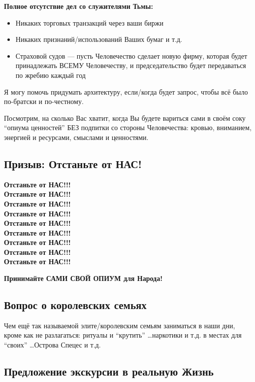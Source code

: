 \documentclass[11pt,a4paper]{article}
\theoremstyle{definition}
\theoremstyle{remark}
\begin{document}
{\textbf{Полное отсутствие дел со служителями Тьмы:}
\begin{itemize}
\item Никаких торговых транзакций через ваши биржи
\item Никаких признаний/использований Ваших бумаг и т.д.
\item Страховой судов — пусть Человечество сделает новую фирму, которая будет 
принадлежать ВСЕМУ Человечеству, и председательство будет передаваться по жребию 
каждый год
\end{itemize}

Я могу помочь придумать архитектуру, если/когда будет запрос, чтобы всё было 
по-братски и по-честному.

Посмотрим, на сколько Вас хватит, когда Вы будете вариться сами в своём соку 
``опиума ценностей'' БЕЗ подпитки со стороны Человечества: кровью, вниманием, 
энергией и ресурсами, смыслами и ценностями.

\subsection{Призыв: Отстаньте от НАС!}

\textbf{Отстаньте от НАС!!!}\\
\textbf{Отстаньте от НАС!!!}\\
\textbf{Отстаньте от НАС!!!}\\
\textbf{Отстаньте от НАС!!!}\\
\textbf{Отстаньте от НАС!!!}\\
\textbf{Отстаньте от НАС!!!}\\
\textbf{Отстаньте от НАС!!!}\\
\textbf{Отстаньте от НАС!!!}\\
\textbf{Отстаньте от НАС!!!}

\textbf{Принимайте САМИ СВОЙ ОПИУМ для Народа!}

\subsection{Вопрос о королевских семьях}

Чем ещё так называемой элите/королевским семьям заниматься в наши дни, кроме как 
не разлагаться: ритуалы и ``крутить'' \ldots наркотики и т.д. в местах для ``своих'' 
\ldots Острова Спецес и т.д.

\subsection{Предложение экскурсии в реальную Жизнь}

}
\end{document}
